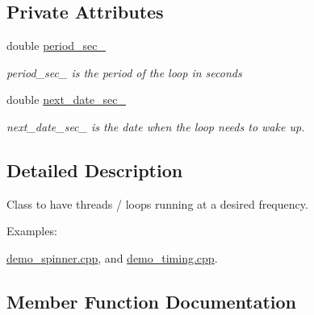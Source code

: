 \subsection*{Private Attributes}
\begin{DoxyCompactItemize}
\item 
\mbox{\label{classreal__time__tools_1_1Spinner_ab227dc08a387d25c5c72fd9dcb164272}} 
double \hyperlink{classreal__time__tools_1_1Spinner_ab227dc08a387d25c5c72fd9dcb164272}{period\+\_\+sec\+\_\+}
\begin{DoxyCompactList}\small\item\em period\+\_\+sec\+\_\+ is the period of the loop in seconds \end{DoxyCompactList}\item 
\mbox{\label{classreal__time__tools_1_1Spinner_a1260eb9978b9840df1a21b18f4d6792d}} 
double \hyperlink{classreal__time__tools_1_1Spinner_a1260eb9978b9840df1a21b18f4d6792d}{next\+\_\+date\+\_\+sec\+\_\+}
\begin{DoxyCompactList}\small\item\em next\+\_\+date\+\_\+sec\+\_\+ is the date when the loop needs to wake up. \end{DoxyCompactList}\end{DoxyCompactItemize}


\subsection{Detailed Description}
Class to have threads / loops running at a desired frequency. \begin{Desc}
\item[Examples\+: ]\par
\hyperlink{demo_spinner_8cpp-example}{demo\+\_\+spinner.\+cpp}, and \hyperlink{demo_timing_8cpp-example}{demo\+\_\+timing.\+cpp}.\end{Desc}


\subsection{Member Function Documentation}
\mbox{\label{classreal__time__tools_1_1Spinner_afa4e24e5dbbbfa2e0d694ef2e3fa3bb8}} 
